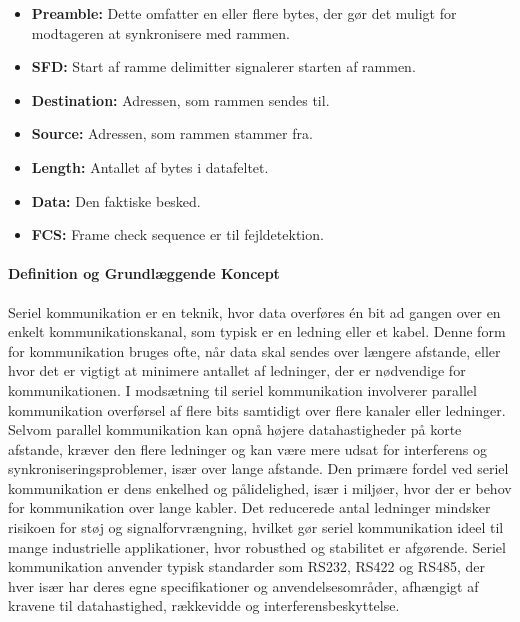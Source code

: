 \begin{itemize}
	\item \textbf{Preamble:} Dette omfatter en eller flere bytes, der gør det muligt for modtageren at synkronisere med rammen.
	\item \textbf{SFD:} Start af ramme delimitter signalerer starten af rammen.
	\item \textbf{Destination:} Adressen, som rammen sendes til.
	\item \textbf{Source:} Adressen, som rammen stammer fra.
	\item \textbf{Length:} Antallet af bytes i datafeltet.
	\item \textbf{Data:} Den faktiske besked.
	\item \textbf{FCS:} Frame check sequence er til fejldetektion.
\end{itemize}

\paragraph{Definition og Grundlæggende Koncept}
Seriel kommunikation er en teknik, hvor data overføres én bit ad gangen over en enkelt kommunikationskanal, som typisk er en ledning eller et kabel. Denne form for kommunikation bruges ofte, når data skal sendes over længere afstande, eller hvor det er vigtigt at minimere antallet af ledninger, der er nødvendige for kommunikationen.
\newline\newline\noindent
I modsætning til seriel kommunikation involverer parallel kommunikation overførsel af flere bits samtidigt over flere kanaler eller ledninger. Selvom parallel kommunikation kan opnå højere datahastigheder på korte afstande, kræver den flere ledninger og kan være mere udsat for interferens og synkroniseringsproblemer, især over lange afstande.
\newline\newline\noindent
Den primære fordel ved seriel kommunikation er dens enkelhed og pålidelighed, især i miljøer, hvor der er behov for kommunikation over lange kabler. Det reducerede antal ledninger mindsker risikoen for støj og signalforvrængning, hvilket gør seriel kommunikation ideel til mange industrielle applikationer, hvor robusthed og stabilitet er afgørende.
\newline\newline\noindent
Seriel kommunikation anvender typisk standarder som RS232, RS422 og RS485, der hver især har deres egne specifikationer og anvendelsesområder, afhængigt af kravene til datahastighed, rækkevidde og interferensbeskyttelse.

